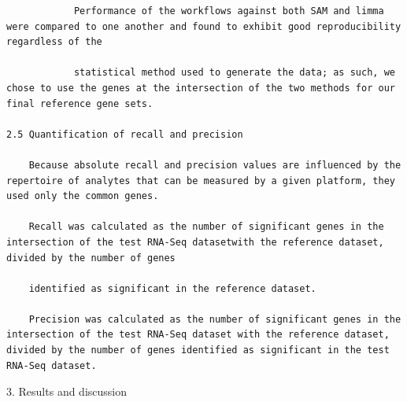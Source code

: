 \documentclass[
]{book}
\begin{document}
\begin{verbatim}
            Performance of the workflows against both SAM and limma were compared to one another and found to exhibit good reproducibility regardless of the

            statistical method used to generate the data; as such, we chose to use the genes at the intersection of the two methods for our final reference gene sets.

2.5 Quantification of recall and precision

    Because absolute recall and precision values are influenced by the repertoire of analytes that can be measured by a given platform, they used only the common genes.

    Recall was calculated as the number of significant genes in the intersection of the test RNA-Seq datasetwith the reference dataset, divided by the number of genes

    identified as significant in the reference dataset.

    Precision was calculated as the number of significant genes in the intersection of the test RNA-Seq dataset with the reference dataset, divided by the number of genes identified as significant in the test RNA-Seq dataset.
\end{verbatim}

3. Results and discussion
\end{document}
